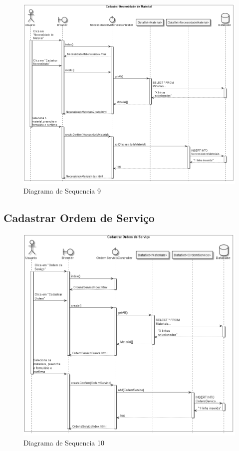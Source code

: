 \documentclass[rascunho,xindy,acronym,symbols]{fei}
\begin{document}
\begin{figure}[H]
    \centering
    \includegraphics[width=\textwidth]{./Images/DS_Cadastrar_Necessidade_Material.jpg}
    \caption{Diagrama de Sequencia 9}
    \label{fig:diag_seq9}
\end{figure}

\subsection{Cadastrar Ordem de Serviço}

\begin{figure}[H]
    \centering
    \includegraphics[scale=0.6, width=400pt]{./Images/DS_Cadastrar_Ordem_Servico.jpg}
    \caption{Diagrama de Sequencia 10}
    \label{fig:diag_seq10}
\end{figure}
\end{document}
